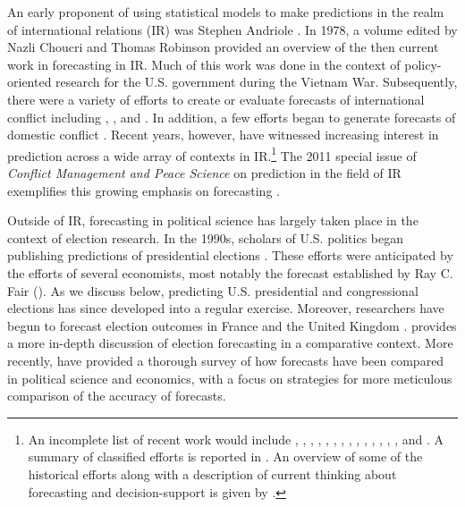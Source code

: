 \documentclass[pdftex,12pt,fullpage,oneside]{amsart}
\begin{document}
An early proponent of using statistical models to make predictions in
the realm of international relations (IR) was Stephen Andriole
\citep{Andriole:Young:1977}. In 1978, a volume edited by Nazli Choucri
and Thomas Robinson \nocite{Choucri:Robinson:1978} provided an
overview of the then current work in forecasting in IR.  Much of this
work was done in the context of policy-oriented research for the
U.S. government during the Vietnam War.  Subsequently, there were a
variety of efforts to create or evaluate forecasts of international
conflict including \citet{Freeman:Job:1979},
\citet{Singer:Wallace:1979}, and \citet{Vincent:1980}. In
addition, a few efforts began to generate forecasts of domestic
conflict \citep[e.g.,][]{Gurr:Lichbach:1986}.  Recent years,
however, have witnessed increasing interest in prediction across a
wide array of contexts in IR.\footnote{An incomplete list of recent
  work would include \citet{Krause:1997}, \citet{Davies:Gurr:1998},
  \citet{Pevehouse:Goldstein:1999}, \citet{Schrodt:Gerner:2000},
  \citet{King:Zeng:2001}, \citet{OBrien:2002}, \citet{BDM:2002},
  \citet{Fearon:Laitin:2003}, \citet{Demarchi:etal:2004}, \citet{Enders:Sandler:2005},
  \citet{Leblang:Satyanath:2006}, \citet{Ward:etal:2007},
  \citet{Brandt:etal:2008}, \citet{Bennett:Stam:2009}, and
  \citet{Gleditsch:Ward:2010}. A summary of classified efforts is
  reported in \citet{Feder:2002}.  An overview of some of the
  historical efforts along with a description of current thinking
  about forecasting and decision-support is given by
  \citet{OBrien:2010}.}  The 2011 special issue of \emph{Conflict
  Management and Peace Science} on prediction in the field of IR
exemplifies this growing emphasis on forecasting
\citep[c.f.,][]{Schneider_etal_2011, Mesquita_2011,
  Brandt_etal_2011}. 
  
Outside of IR, forecasting in political science has largely taken
place in the context of election research.  In the 1990s, scholars of
U.S. politics began publishing predictions of presidential elections
\citep{Campbell:1990, Campbell:1992}. These efforts were anticipated
by the efforts of several economists, most notably the forecast
established by Ray C. Fair (\citeyear{Fair:1978}). As we discuss
below, predicting U.S. presidential and congressional elections has
since developed into a regular exercise.  Moreover, researchers have
begun to forecast election outcomes in France
\citep[e.g.,][]{Jerome:1999} and the United Kingdom
\citep[e.g.,][]{Whitely:2005}. \citet{Lewis-Beck:2005} provides a more
in-depth discussion of election forecasting in a comparative context.
More recently, \citet{brandt:freeman:schrodt:2011} have provided a
thorough survey of how forecasts have been compared in political
science and economics, with a focus on strategies for more meticulous
comparison of the accuracy of forecasts.
\end{document}
